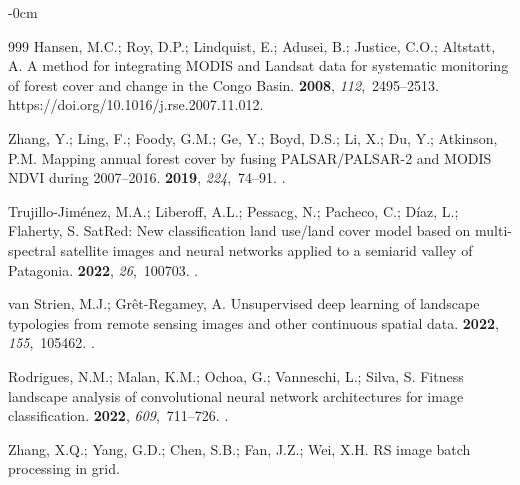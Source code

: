 \documentclass[applsci,article,accept,pdftex,moreauthors]{Definitions/mdpi}
\begin{document}
\begin{adjustwidth}{-\extralength}{0cm}
\begin{thebibliography}{999}
Hansen, M.C.; Roy, D.P.; Lindquist, E.; Adusei, B.; Justice, C.O.; Altstatt, A.
\newblock A method for integrating MODIS and Landsat data for systematic
  monitoring of forest cover and change in the Congo Basin.
 {\bf 2008}, {\em
  112},~2495--2513. {{https://doi.org/10.1016/j.rse.2007.11.012}}.

Zhang, Y.; Ling, F.; Foody, G.M.; Ge, Y.; Boyd, D.S.; Li, X.; Du, Y.; Atkinson,
  P.M.
\newblock Mapping annual forest cover by fusing PALSAR/PALSAR-2 and MODIS NDVI
  during 2007–2016.
 {\bf 2019}, {\em 224},~74--91.
.

Trujillo-Jiménez, M.A.; Liberoff, A.L.; Pessacg, N.; Pacheco, C.; Díaz, L.;
  Flaherty, S.
\newblock SatRed: New classification land use/land cover model based on
  multi-spectral satellite images and neural networks applied to a semiarid
  valley of Patagonia.
 {\bf
  2022}, {\em 26},~100703.
.

{van Strien}, M.J.; Grêt-Regamey, A.
\newblock Unsupervised deep learning of landscape typologies from remote
  sensing images and other continuous spatial data.
 {\bf 2022}, {\em
  155},~105462.
.

Rodrigues, N.M.; Malan, K.M.; Ochoa, G.; Vanneschi, L.; Silva, S.
\newblock Fitness landscape analysis of convolutional neural network
  architectures for image classification.
 {\bf 2022}, {\em 609},~711--726.
.

Zhang, X.Q.; Yang, G.D.; Chen, S.B.; Fan, J.Z.; Wei, X.H.
\newblock RS image batch processing in grid.
\newblock {}


\end{thebibliography}
\end{adjustwidth}
\end{document}

